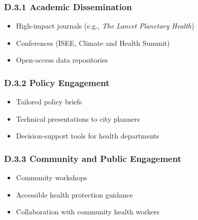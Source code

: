 \graphicspath{{./}{./sections/images/}{./images/}}\documentclass[12pt,a4paper,landscape]{article}
\begin{document}
\subsubsection*{D.3.1 Academic Dissemination}
\begin{itemize}[leftmargin=*]
    \item High-impact journals (e.g., \textit{The Lancet Planetary Health})
    \item Conferences (ISEE, Climate and Health Summit)
    \item Open-access data repositories
\end{itemize}

\subsubsection*{D.3.2 Policy Engagement}
\begin{itemize}[leftmargin=*]
    \item Tailored policy briefs
    \item Technical presentations to city planners
    \item Decision-support tools for health departments
\end{itemize}

\subsubsection*{D.3.3 Community and Public Engagement}
\begin{itemize}[leftmargin=*]
    \item Community workshops
    \item Accessible health protection guidance
    \item Collaboration with community health workers
\end{itemize}
\end{document}
